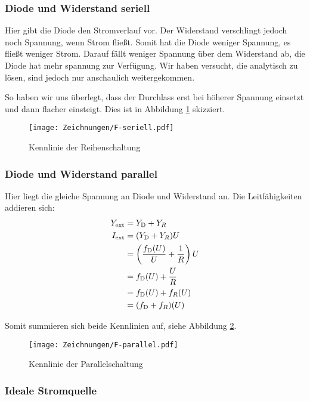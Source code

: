 \subsubsection{Diode und Widerstand seriell}

Hier gibt die Diode den Stromverlauf vor. Der Widerstand verschlingt jedoch
noch Spannung, wenn Strom fließt. Somit hat die Diode weniger Spannung, es
fließt weniger Strom. Darauf fällt weniger Spannung über dem Widerstand ab, die
Diode hat mehr spannung zur Verfügung. Wir haben versucht, die analytisch zu
lösen, sind jedoch nur anschaulich weitergekommen.

So haben wir uns überlegt, dass der Durchlass erst bei höherer Spannung
einsetzt und dann flacher einsteigt. Dies ist in Abbildung \ref{fig:F-seriell}
skizziert.

\begin{figure}[h]
	\centering
	\caption{%
		Kennlinie der Reihenschaltung
	}
	\label{fig:F-seriell}
	\texttt{[image: Zeichnungen/F-seriell.pdf]}
\end{figure}

\subsubsection{Diode und Widerstand parallel}

Hier liegt die gleiche Spannung an Diode und Widerstand an. Die Leitfähigkeiten
addieren sich:
\begin{align*}
	Y_\text{ext} &= Y_\text D + Y_R \\
	I_\text{ext} &= (Y_\text D + Y_R) U \\
	&= \del{\frac{f_\text D(U)}U + \frac 1R} U \\
	&= f_\text D (U) + \frac UR \\
	&= f_\text D (U) + f_R(U) \\
	&= (f_\text D + f_R)(U)
\end{align*}

Somit summieren sich beide Kennlinien auf, siehe Abbildung
\ref{fig:F-parallel}.

\begin{figure}[h]
	\centering
	\caption{%
		Kennlinie der Parallelschaltung
	}
	\label{fig:F-parallel}
	\texttt{[image: Zeichnungen/F-parallel.pdf]}
\end{figure}

\subsubsection{Ideale Stromquelle}


